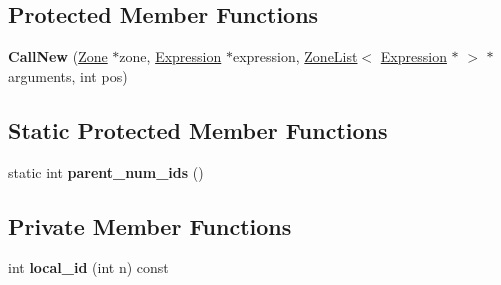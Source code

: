 \subsection*{Protected Member Functions}
\begin{DoxyCompactItemize}
\item 
{\bfseries Call\+New} (\hyperlink{classv8_1_1internal_1_1_zone}{Zone} $\ast$zone, \hyperlink{classv8_1_1internal_1_1_expression}{Expression} $\ast$expression, \hyperlink{classv8_1_1internal_1_1_zone_list}{Zone\+List}$<$ \hyperlink{classv8_1_1internal_1_1_expression}{Expression} $\ast$ $>$ $\ast$arguments, int pos)\hypertarget{classv8_1_1internal_1_1_call_new_ad0865d8e6c435358512fde6d2fcfda2b}{}\label{classv8_1_1internal_1_1_call_new_ad0865d8e6c435358512fde6d2fcfda2b}

\end{DoxyCompactItemize}
\subsection*{Static Protected Member Functions}
\begin{DoxyCompactItemize}
\item 
static int {\bfseries parent\+\_\+num\+\_\+ids} ()\hypertarget{classv8_1_1internal_1_1_call_new_a09c6cfc73d9cfa16ddfcd7a1df0a617e}{}\label{classv8_1_1internal_1_1_call_new_a09c6cfc73d9cfa16ddfcd7a1df0a617e}

\end{DoxyCompactItemize}
\subsection*{Private Member Functions}
\begin{DoxyCompactItemize}
\item 
int {\bfseries local\+\_\+id} (int n) const \hypertarget{classv8_1_1internal_1_1_call_new_a77353a6ec91ccd90e51a58f59765cce6}{}\label{classv8_1_1internal_1_1_call_new_a77353a6ec91ccd90e51a58f59765cce6}

\end{DoxyCompactItemize}
